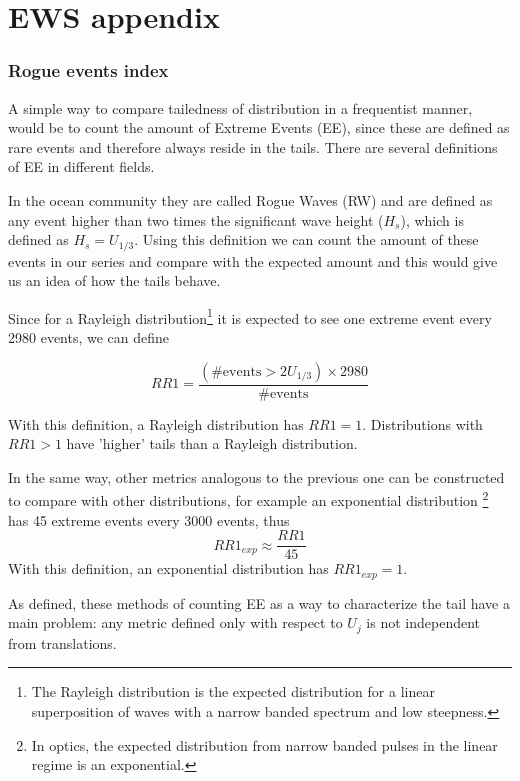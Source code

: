 

\chapter{EWS appendix}

\subsection{Rogue events index}	
A simple way to compare tailedness of distribution in a frequentist manner, would be to count the amount of Extreme Events (EE), since these are defined as rare events and therefore always reside in the tails. 
There are several definitions of EE in different fields.

In the ocean community they are called Rogue Waves (RW) and are defined as any event higher than two times the significant wave height ($H_s$), which is defined as $H_s=U_{1/3}$. 
Using this definition we can count the amount of these events in our series and compare with the expected amount and this would give us an idea of how the tails behave. 

Since for a Rayleigh distribution\footnote{The Rayleigh distribution is the expected distribution for a linear superposition of waves with a narrow banded spectrum and low steepness.} it is expected to see one extreme event every 2980 events, we can define 

\begin{equation}
	RR1=\frac{(\textrm{\# events}>2U_{1/3})\times 2980}{\textrm{\# events}}
	\label{defRR1}
\end{equation}

With this definition, a Rayleigh distribution has $RR1=1$. Distributions with $RR1 >1$ have 'higher' tails than a Rayleigh distribution. 

In the same way, other metrics analogous to the previous one can be constructed to compare with other distributions, for example an exponential distribution \footnote{In optics, the expected distribution from narrow banded pulses in the linear regime is an exponential. } has 45 extreme events every 3000 events, thus 
\begin{equation}
	RR1_{exp} \approx  \frac{RR1}{45}
	\label{defRR2}
\end{equation}
With this definition, an exponential distribution has $RR1_{exp}=1$.

As defined, these methods of counting EE as a way to characterize the tail have a main problem: any metric defined only with respect to $U_{j}$ is not independent from translations.

